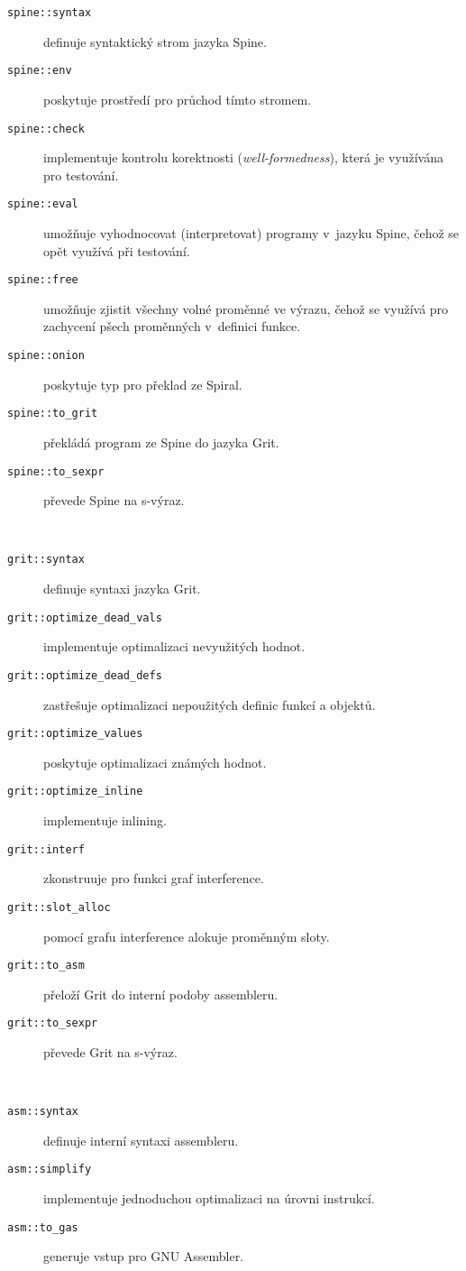 \begin{description}
  \item[\texttt{spine::syntax}] definuje syntaktický strom jazyka Spine.
  \item[\texttt{spine::env}] poskytuje prostředí pro průchod tímto stromem.
  \item[\texttt{spine::check}] implementuje kontrolu korektnosti
    (\emph{well-formedness}), která je využívána pro testování.
  \item[\texttt{spine::eval}] umožňuje vyhodnocovat (interpretovat) programy
    v~jazyku Spine, čehož se opět využívá při testování.
  \item[\texttt{spine::free}] umožňuje zjistit všechny volné proměnné ve výrazu,
    čehož se využívá pro zachycení pšech proměnných v~definici funkce.
  \item[\texttt{spine::onion}] poskytuje typ  pro překlad ze Spiral.
  \item[\texttt{spine::to_grit}] překládá program ze Spine do jazyka Grit.
  \item[\texttt{spine::to_sexpr}] převede Spine na s-výraz.
\end{description}
~
\begin{description}
  \item[\texttt{grit::syntax}] definuje syntaxi jazyka Grit.
  \item[\texttt{grit::optimize_dead_vals}] implementuje optimalizaci nevyužitých
    hodnot.
  \item[\texttt{grit::optimize_dead_defs}] zastřešuje optimalizaci nepoužitých
    definic funkcí a objektů.
  \item[\texttt{grit::optimize_values}] poskytuje optimalizaci známých hodnot.
  \item[\texttt{grit::optimize_inline}] implementuje inlining.
  \item[\texttt{grit::interf}] zkonstruuje pro funkci graf interference.
  \item[\texttt{grit::slot_alloc}] pomocí grafu interference alokuje proměnným
    sloty.
  \item[\texttt{grit::to_asm}] přeloží Grit do interní podoby assembleru.
  \item[\texttt{grit::to_sexpr}] převede Grit na s-výraz.
\end{description}
~
\begin{description}
  \item[\texttt{asm::syntax}] definuje interní syntaxi assembleru.
  \item[\texttt{asm::simplify}] implementuje jednoduchou optimalizaci na úrovni
    instrukcí.
  \item[\texttt{asm::to_gas}] generuje vstup pro GNU Assembler.
\end{description}

